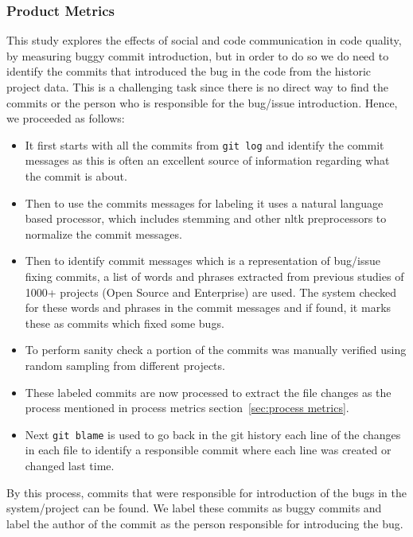 \documentclass[sigconf,review]{acmart}
\newcommand{\bi}{\begin{itemize}}
\newcommand{\ei}{\end{itemize}}
\begin{document}
\subsubsection{Product Metrics}
\label{sec:Product Merics}
This study explores the effects of social and code communication in code quality, by measuring buggy commit introduction,  but in order to do so we do need to identify the commits that introduced the bug in the code from the historic project data. This is   a 
challenging task since there is no direct way to find the commits or the person who is responsible for the bug/issue introduction. Hence,
we proceeded as follows:

\bi
\item
It first starts with all the commits from {\tt git log} and identify the commit messages as this is often an excellent source of information regarding what the commit is about.
\item
Then to use the commits messages for labeling it uses a natural language based processor, which includes stemming and other nltk preprocessors to normalize the commit messages.
\item
Then to identify commit messages which is a representation of bug/issue fixing commits, a list of words and phrases extracted from previous studies of 1000+ projects (Open Source and Enterprise) are used. The system checked for these words and phrases in the commit messages and if found, it marks these as commits which fixed some bugs.
\item
To perform sanity check  a portion of the commits was manually verified using random sampling from different projects.
\item
These labeled commits are now processed to extract the file changes as the process mentioned in process metrics section~\ref{sec:process metrics}.
\item
Next {\tt git blame} is used to go back in the git history each line of the changes in each file to identify a responsible commit where each line was created or changed last time.
\ei
By this process, commits that were responsible for introduction of the bugs in the system/project can be found. We label these commits as buggy commits and label the author of the commit as the person responsible for introducing the bug.
\end{document}
